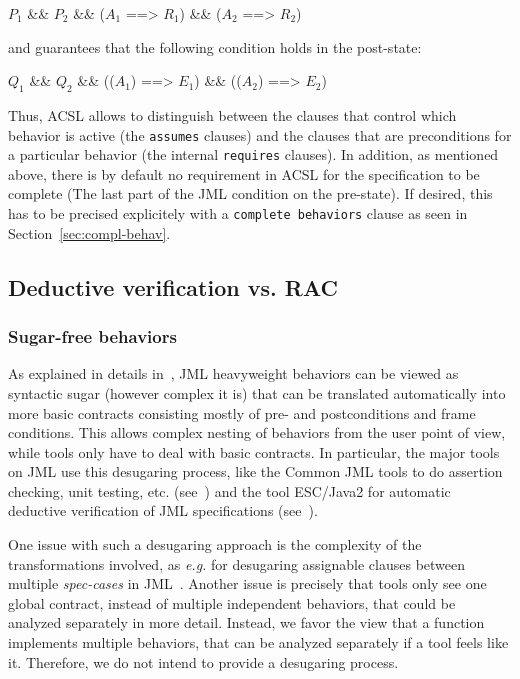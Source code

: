 \begin{listing-nonumber}
  $P_1$ && $P_2$ && ($A_1$ ==> $R_1$) && ($A_2$ ==> $R_2$)
\end{listing-nonumber}

\noindent
and guarantees that the following condition holds in the post-state:

\begin{listing-nonumber}
$Q_1$ && $Q_2$ && (\old($A_1$) ==> $E_1$) && (\old($A_2$) ==> $E_2$)
\end{listing-nonumber}

Thus, ACSL allows to distinguish between the clauses that control
which behavior is active (the \lstinline|assumes| clauses) and the
clauses that are preconditions for a particular behavior (the internal
\lstinline|requires| clauses). In addition, as mentioned above, there is
by default no requirement in ACSL for the specification to be complete (The
last part of the JML condition on the pre-state). If desired, this has
to be precised explicitely with a \lstinline+complete behaviors+ clause as
seen in Section~\ref{sec:compl-behav}.

\subsection{Deductive verification vs. RAC}

\subsubsection*{Sugar-free behaviors}

As explained in details in~\cite{raghavan00desugaring}, JML
heavyweight behaviors can be viewed as syntactic sugar (however
complex it is) that can be translated automatically into more basic
contracts consisting mostly of pre- and postconditions and frame
conditions.  This allows complex nesting of behaviors from the user
point of view, while tools only have to deal with basic contracts. In
particular, the major tools on JML use this desugaring process, like
the Common JML tools to do assertion checking, unit testing,
etc. (see~\cite{leavens00jml}) and the tool ESC/Java2 for
automatic deductive verification of JML specifications
(see~\cite{kiriny07implnotes}).

One issue with such a desugaring approach is the complexity of the
transformations involved, as \emph{e.g.} for desugaring assignable clauses
between multiple \textit{spec-cases} in
JML~\cite{raghavan00desugaring}.  Another issue is precisely that
tools only see one global contract, instead of multiple independent
behaviors, that could be analyzed separately in more detail.
Instead, we favor the view that a function implements multiple
behaviors, that can be analyzed separately if a tool feels like
it. Therefore, we do not intend to provide a desugaring process.

